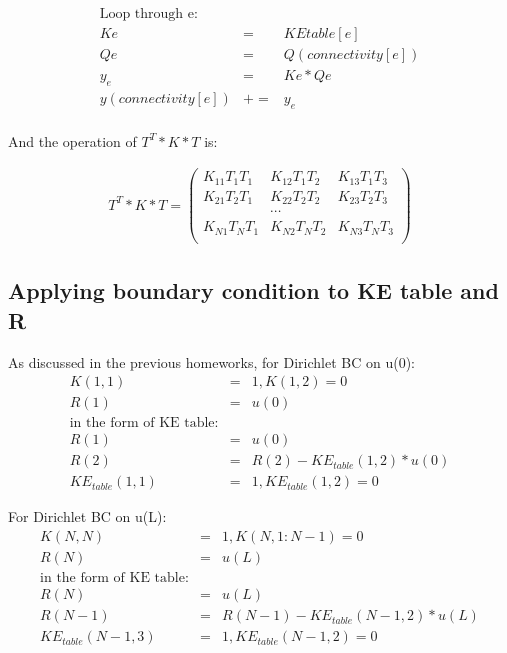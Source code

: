 \documentclass[paper=a4, fontsize=11pt]{article} %
\begin{document}
\begin{eqnarray}
\mbox{Loop through e:} &&\nonumber\\
Ke &= & KE table[e] \nonumber\\
Qe &= & Q(connectivity[e]) \nonumber\\
y_e &= & Ke * Qe \nonumber\\
y(connectivity[e]) & += & y_e \nonumber\\  
\end{eqnarray}


And the operation of $T^T*K*T$ is:

\begin{eqnarray}
T^T*K*T = 
\begin{pmatrix}
K_{11}T_1T_1 & K_{12}T_1T_2 & K_{13} T_1T_3 \\
K_{21}T_2T_1 & K_{22}T_2T_2 & K_{23} T_2T_3 \\
 & \cdots &\\
K_{N1}T_NT_1 & K_{N2}T_NT_2 & K_{N3} T_NT_3 \\ 
\end{pmatrix}
\end{eqnarray}
 

\subsection{Applying boundary condition to KE table and R}

As discussed in the previous homeworks, for Dirichlet BC on u(0):
\begin{align*}
K(1,1)& =& 1, K(1, 2) =0 \\
R(1) &=& u(0)\\
\mbox{in the form of KE table:} &&\\
R(1) &=& u(0)\\
R(2) &=& R(2)-KE_{table} (1,2) * u(0)\\
KE_{table} (1, 1) & =& 1, KE_{table} (1, 2) =0
\end{align*}

For Dirichlet BC on u(L):
\begin{align*}
K(N,N) &=&1,K(N, 1:N-1) =0\\ 
R(N) &=& u(L) \\
\mbox{in the form of KE table:} &&\\
R(N)&=&u(L)\\
R(N-1)&=&R(N-1)-KE_{table} (N-1,2) * u(L)\\
KE_{table} (N-1, 3)& =&1, KE_{table} (N-1, 2) =0
\end{align*}
\end{document}

